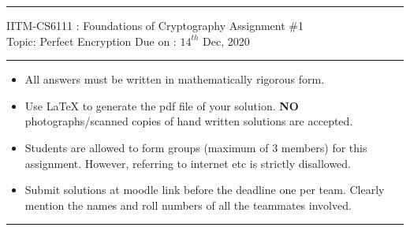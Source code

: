 \documentclass[11pt]{exam}
\begin{document}

\hrule
\vspace{3mm}
\noindent
{\sf IITM-CS6111 : Foundations of Cryptography  \hfill Assignment \#1 }
\vspace{3mm} \\
\noindent
{\sf Topic: Perfect Encryption \hfill Due on : $14^{th}$ Dec, 2020}
\vspace{3mm}
\hrule

{\small 
\begin{itemize}
\itemsep 0pt
\item All answers must be written in mathematically rigorous form.
\item Use LaTeX to generate the pdf file of your solution. \textbf{NO} photographs/scanned copies of hand written solutions are accepted. 
\item Students are allowed to form groups (maximum of $3$ members) for this assignment. However, referring to internet etc is strictly disallowed.
\item Submit solutions at moodle link before the deadline one per team. Clearly mention the names and roll numbers of all the teammates involved.
\end{itemize}
}

\hrule
\end{document}
